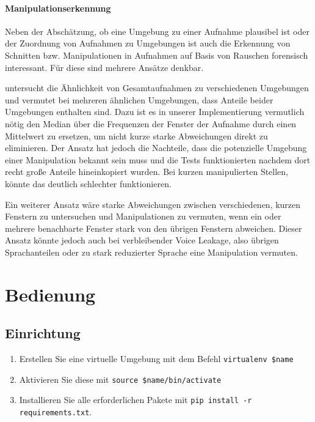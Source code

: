 \documentclass[
	fontsize=10.5pt,
	marginpar=false,
	ngerman,
	accentcolor=3d
	]{tudapub}
\begin{document}
\paragraph{Manipulationserkennung}
\label{manipulationdet}

Neben der Abschätzung, ob eine Umgebung zu einer Aufnahme plausibel ist oder der Zuordnung von Aufnahmen zu Umgebungen ist auch die Erkennung von Schnitten bzw. Manipulationen in Aufnahmen auf Basis von Rauschen forensisch interessant. Für diese sind mehrere Ansätze denkbar.

\cite{ikram_digital_2010} untersucht die Ähnlichkeit von Gesamtaufnahmen zu verschiedenen Umgebungen und vermutet bei mehreren ähnlichen Umgebungen, dass Anteile beider Umgebungen enthalten sind. Dazu ist es in unserer Implementierung vermutlich nötig den Median über die Frequenzen der Fenster der Aufnahme durch einen Mittelwert zu ersetzen, um nicht kurze starke Abweichungen direkt zu eliminieren. Der Ansatz hat jedoch die Nachteile, dass die potenzielle Umgebung einer Manipulation bekannt sein muss und die Tests funktionierten nachdem dort recht große Anteile hineinkopiert wurden. Bei kurzen manipulierten Stellen, könnte das deutlich schlechter funktionieren.

Ein weiterer Ansatz wäre starke Abweichungen zwischen verschiedenen, kurzen Fenstern zu untersuchen und Manipulationen zu vermuten, wenn ein oder mehrere benachbarte Fenster stark von den übrigen Fenstern abweichen. Dieser Ansatz könnte jedoch auch bei verbleibender Voice Leakage, also übrigen Sprachanteilen oder zu stark reduzierter Sprache eine Manipulation vermuten.

\pagebreak

\section{Bedienung}
\label{usage}


\subsection{Einrichtung}

\begin{enumerate}
	\item Erstellen Sie eine virtuelle Umgebung mit dem Befehl \texttt{virtualenv \$name}
	\item Aktivieren Sie diese mit \texttt{source \$name/bin/activate}
	\item Installieren Sie alle erforderlichen Pakete mit \texttt{pip install -r requirements.txt}.
\end{enumerate}
\end{document}
